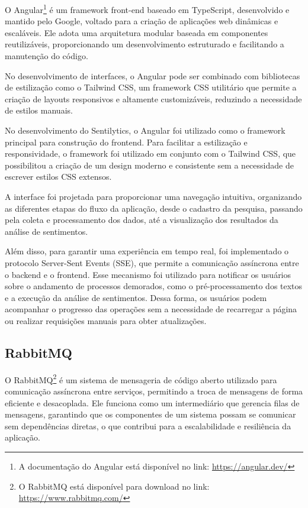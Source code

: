 \documentclass[
	12pt,				%
	oneside,			%
	a4paper,			%
	english,			%
	french,				%
	spanish,			%
	brazil				%
	]{abntex2}
\begin{document}
O Angular\footnote{A documentação do Angular está disponível no link:
  \url{https://angular.dev/}} é um framework front-end baseado em
TypeScript, desenvolvido e mantido pelo Google, voltado para a criação
de aplicações web dinâmicas e escaláveis. Ele adota uma arquitetura
modular baseada em componentes reutilizáveis, proporcionando um
desenvolvimento estruturado e facilitando a manutenção do código.

No desenvolvimento de interfaces, o Angular pode ser combinado com
bibliotecas de estilização como o Tailwind CSS, um framework CSS
utilitário que permite a criação de layouts responsivos e altamente
customizáveis, reduzindo a necessidade de estilos manuais.

No desenvolvimento do Sentilytics, o Angular foi utilizado como o
framework principal para construção do frontend. Para facilitar a
estilização e responsividade, o framework foi utilizado em conjunto com
o Tailwind CSS, que possibilitou a criação de um design moderno e
consistente sem a necessidade de escrever estilos CSS extensos.

A interface foi projetada para proporcionar uma navegação intuitiva,
organizando as diferentes etapas do fluxo da aplicação, desde o cadastro
da pesquisa, passando pela coleta e processamento dos dados, até a
visualização dos resultados da análise de sentimentos.

Além disso, para garantir uma experiência em tempo real, foi
implementado o protocolo Server-Sent Events (SSE), que permite a
comunicação assíncrona entre o backend e o frontend. Esse mecanismo foi
utilizado para notificar os usuários sobre o andamento de processos
demorados, como o pré-processamento dos textos e a execução da análise
de sentimentos. Dessa forma, os usuários podem acompanhar o progresso
das operações sem a necessidade de recarregar a página ou realizar
requisições manuais para obter atualizações.

\hypertarget{rabbitmq}{%
\subsection{RabbitMQ}\label{rabbitmq}}

O RabbitMQ\footnote{O RabbitMQ está disponível para download no link:
  \url{https://www.rabbitmq.com/}} é um sistema de mensageria de código
aberto utilizado para comunicação assíncrona entre serviços, permitindo
a troca de mensagens de forma eficiente e desacoplada. Ele funciona como
um intermediário que gerencia filas de mensagens, garantindo que os
componentes de um sistema possam se comunicar sem dependências diretas,
o que contribui para a escalabilidade e resiliência da aplicação.
\end{document}
